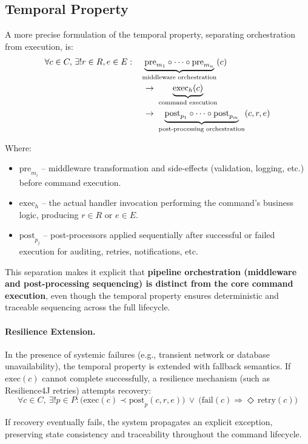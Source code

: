 \subsection{Temporal Property}
A more precise formulation of the temporal property, separating orchestration from execution, is:
\begin{align}
\forall c \in C,\, \exists! r \in R, e \in E : \quad
& \underbrace{\mathrm{pre}_{m_1} \circ \dots \circ \mathrm{pre}_{m_n}}_{\text{middleware orchestration}}(c) \notag\\
& \;\to\; 
\underbrace{\mathrm{exec}_h(c)}_{\text{command execution}} \notag\\
& \;\to\; 
\underbrace{\mathrm{post}_{p_1} \circ \dots \circ \mathrm{post}_{p_m}}_{\text{post-processing orchestration}}(c,r,e)
\end{align}

Where:
\begin{itemize}
    \item $\mathrm{pre}_{m_i}$ – middleware transformation and side-effects (validation, logging, etc.) before command execution.
    \item $\mathrm{exec}_h$ – the actual handler invocation performing the command's business logic, producing $r \in R$ or $e \in E$.
    \item $\mathrm{post}_{p_j}$ – post-processors applied sequentially after successful or failed execution for auditing, retries, notifications, etc.
\end{itemize}

This separation makes it explicit that \textbf{pipeline orchestration (middleware and post-processing sequencing) is distinct from the core command execution}, even though the temporal property ensures deterministic and traceable sequencing across the full lifecycle.

\paragraph{Resilience Extension.}
In the presence of systemic failures (e.g., transient network or database unavailability),
the temporal property is extended with fallback semantics.
If $\mathrm{exec}(c)$ cannot complete successfully, a resilience mechanism 
(such as Resilience4J retries) attempts recovery:
\[
\forall c \in C,\ \exists! p \in P :
\big(
    \mathrm{exec}(c) \prec \mathrm{post}_p(c,r,e)
\big)
\ \lor\
\big(
    \mathrm{fail}(c) \Rightarrow \Diamond\, \mathrm{retry}(c)
\big)
\]

If recovery eventually fails, the system propagates an explicit exception,
preserving state consistency and traceability throughout the command lifecycle.


